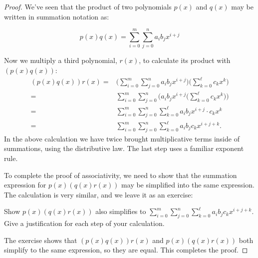 \begin{proof}{} We've seen that the product of two polynomials $p(x)$ and $q(x)$ may be written in summation notation as:

\[
p(x) q(x) =\sum_{i=0}^{m}\sum_{j=0}^{n}a_i b_j x^{i+j}
\]

Now we multiply a third polynomial, $r(x)$, to calculate its product with $(p(x)q(x))$:
\begin{align*}
(p(x) q(x))r(x) =&  \Big( \sum_{i=0}^{m}\sum_{j=0}^{n}a_i b_j x^{i+j} \Big)\Big(\sum_{k=0}^{\ell} c_k x^k \Big)  \\
=&   \sum_{i=0}^{m}\sum_{j=0}^{n} \Big(a_i b_j x^{i+j}\Big(\sum_{k=0}^{\ell} c_k x^k \Big) \Big)  \\
=& \sum_{i=0}^{m}\sum_{j=0}^{n}\sum_{k=0}^{\ell} a_i b_j x^{i+j} \cdot c_k x^k \\
=&  \sum_{i=0}^{m}\sum_{j=0}^{n}\sum_{k=0}^{\ell} a_i b_j  c_k x^{i+j+k}. 
\end{align*}
In the above calculation we have twice brought multiplicative terms inside of summations, using the distributive law.  The last step uses a familiar exponent rule.

To complete the proof of associativity, we need to show that the summation expression for  $p(x) (q(x)r(x))$ may be simplified into the same expression. 
The calculation is very similar, and we leave it as an exercise:

\begin{exercise}{}
Show $p(x) (q(x)r(x))$ also simplifies to  $\displaystyle{\sum_{i=0}^{m}\sum_{j=0}^{n}\sum_{k=0}^{\ell} a_i b_j  c_k x^{i+j+k}}$. Give a justification for each step of your calculation.
\end{exercise}
The exercise shows that $(p(x) q(x)) r(x)$ and  $p(x) (q(x) r(x))$ both simplify to the same expression, so they are equal. This completes the proof.
\end {proof}

